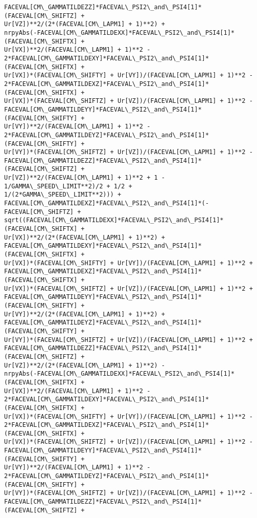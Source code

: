 \documentclass[landscape,letterpaper,10pt,english]{article}
\begin{document}
\begin{Verbatim}[commandchars=\\\{\}]
FACEVAL[CM\_GAMMATILDEZZ]*FACEVAL\_PSI2\_and\_PSI4[1]*(FACEVAL[CM\_SHIFTZ] +
Ur[VZ])**2/(2*(FACEVAL[CM\_LAPM1] + 1)**2) +
nrpyAbs(-FACEVAL[CM\_GAMMATILDEXX]*FACEVAL\_PSI2\_and\_PSI4[1]*(FACEVAL[CM\_SHIFTX] +
Ur[VX])**2/(FACEVAL[CM\_LAPM1] + 1)**2 -
2*FACEVAL[CM\_GAMMATILDEXY]*FACEVAL\_PSI2\_and\_PSI4[1]*(FACEVAL[CM\_SHIFTX] +
Ur[VX])*(FACEVAL[CM\_SHIFTY] + Ur[VY])/(FACEVAL[CM\_LAPM1] + 1)**2 -
2*FACEVAL[CM\_GAMMATILDEXZ]*FACEVAL\_PSI2\_and\_PSI4[1]*(FACEVAL[CM\_SHIFTX] +
Ur[VX])*(FACEVAL[CM\_SHIFTZ] + Ur[VZ])/(FACEVAL[CM\_LAPM1] + 1)**2 -
FACEVAL[CM\_GAMMATILDEYY]*FACEVAL\_PSI2\_and\_PSI4[1]*(FACEVAL[CM\_SHIFTY] +
Ur[VY])**2/(FACEVAL[CM\_LAPM1] + 1)**2 -
2*FACEVAL[CM\_GAMMATILDEYZ]*FACEVAL\_PSI2\_and\_PSI4[1]*(FACEVAL[CM\_SHIFTY] +
Ur[VY])*(FACEVAL[CM\_SHIFTZ] + Ur[VZ])/(FACEVAL[CM\_LAPM1] + 1)**2 -
FACEVAL[CM\_GAMMATILDEZZ]*FACEVAL\_PSI2\_and\_PSI4[1]*(FACEVAL[CM\_SHIFTZ] +
Ur[VZ])**2/(FACEVAL[CM\_LAPM1] + 1)**2 + 1 - 1/GAMMA\_SPEED\_LIMIT**2)/2 + 1/2 +
1/(2*GAMMA\_SPEED\_LIMIT**2))) +
FACEVAL[CM\_GAMMATILDEXZ]*FACEVAL\_PSI2\_and\_PSI4[1]*(-FACEVAL[CM\_SHIFTZ] +
sqrt((FACEVAL[CM\_GAMMATILDEXX]*FACEVAL\_PSI2\_and\_PSI4[1]*(FACEVAL[CM\_SHIFTX] +
Ur[VX])**2/(2*(FACEVAL[CM\_LAPM1] + 1)**2) +
FACEVAL[CM\_GAMMATILDEXY]*FACEVAL\_PSI2\_and\_PSI4[1]*(FACEVAL[CM\_SHIFTX] +
Ur[VX])*(FACEVAL[CM\_SHIFTY] + Ur[VY])/(FACEVAL[CM\_LAPM1] + 1)**2 +
FACEVAL[CM\_GAMMATILDEXZ]*FACEVAL\_PSI2\_and\_PSI4[1]*(FACEVAL[CM\_SHIFTX] +
Ur[VX])*(FACEVAL[CM\_SHIFTZ] + Ur[VZ])/(FACEVAL[CM\_LAPM1] + 1)**2 +
FACEVAL[CM\_GAMMATILDEYY]*FACEVAL\_PSI2\_and\_PSI4[1]*(FACEVAL[CM\_SHIFTY] +
Ur[VY])**2/(2*(FACEVAL[CM\_LAPM1] + 1)**2) +
FACEVAL[CM\_GAMMATILDEYZ]*FACEVAL\_PSI2\_and\_PSI4[1]*(FACEVAL[CM\_SHIFTY] +
Ur[VY])*(FACEVAL[CM\_SHIFTZ] + Ur[VZ])/(FACEVAL[CM\_LAPM1] + 1)**2 +
FACEVAL[CM\_GAMMATILDEZZ]*FACEVAL\_PSI2\_and\_PSI4[1]*(FACEVAL[CM\_SHIFTZ] +
Ur[VZ])**2/(2*(FACEVAL[CM\_LAPM1] + 1)**2) -
nrpyAbs(-FACEVAL[CM\_GAMMATILDEXX]*FACEVAL\_PSI2\_and\_PSI4[1]*(FACEVAL[CM\_SHIFTX] +
Ur[VX])**2/(FACEVAL[CM\_LAPM1] + 1)**2 -
2*FACEVAL[CM\_GAMMATILDEXY]*FACEVAL\_PSI2\_and\_PSI4[1]*(FACEVAL[CM\_SHIFTX] +
Ur[VX])*(FACEVAL[CM\_SHIFTY] + Ur[VY])/(FACEVAL[CM\_LAPM1] + 1)**2 -
2*FACEVAL[CM\_GAMMATILDEXZ]*FACEVAL\_PSI2\_and\_PSI4[1]*(FACEVAL[CM\_SHIFTX] +
Ur[VX])*(FACEVAL[CM\_SHIFTZ] + Ur[VZ])/(FACEVAL[CM\_LAPM1] + 1)**2 -
FACEVAL[CM\_GAMMATILDEYY]*FACEVAL\_PSI2\_and\_PSI4[1]*(FACEVAL[CM\_SHIFTY] +
Ur[VY])**2/(FACEVAL[CM\_LAPM1] + 1)**2 -
2*FACEVAL[CM\_GAMMATILDEYZ]*FACEVAL\_PSI2\_and\_PSI4[1]*(FACEVAL[CM\_SHIFTY] +
Ur[VY])*(FACEVAL[CM\_SHIFTZ] + Ur[VZ])/(FACEVAL[CM\_LAPM1] + 1)**2 -
FACEVAL[CM\_GAMMATILDEZZ]*FACEVAL\_PSI2\_and\_PSI4[1]*(FACEVAL[CM\_SHIFTZ] +

\end{Verbatim}
\end{document}
